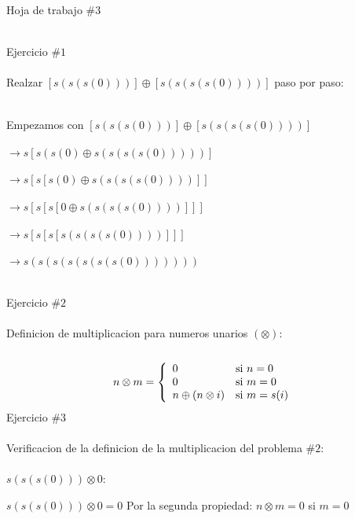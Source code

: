 \documentclass[]{article}
\begin{document}
\begin{center}
\Huge
Hoja de trabajo $\# 3$\\~\\
\end{center}
\Large
Ejercicio $\# 1$\\~\\
\normalsize
Realzar $[s(s(s(0)))] \oplus [s(s(s(s(0))))]$ paso por paso:\\~\\
\begin{center}
Empezamos con $[s(s(s(0)))] \oplus [s(s(s(s(0))))]$\\~\\
$\rightarrow s[s(s(0) \oplus s(s(s(s(0)))))]$\\~\\
$\rightarrow s[s[s(0) \oplus s(s(s(s(0))))]]$\\~\\
$\rightarrow s[s[s[0 \oplus s(s(s(s(0))))]]]$\\~\\
$\rightarrow s[s[s[s(s(s(s(0))))]]]$\\~\\
$\rightarrow s(s(s(s(s(s(s(0)))))))$\\~\\
\end{center}
\Large 
Ejercicio $\# 2$\\~\\
\normalsize
Definicion de multiplicacion para numeros unarios $(\otimes)$:\\~\\
\[
        n\otimes m = \left\{
        \begin{array}{l l}
            0 & \mbox{si } n=0 \\
            0 & \mbox{si } m=0 \\
            n \oplus (n \otimes i) & \mbox{si } m=s(i)\\
        \end{array}
        \right.
\]
\Large 
Ejercicio $\# 3$\\~\\
\normalsize
Verificacion de la definicion de la multiplicacion del problema $\# 2$:\\~\\
$s(s(s(0))) \otimes 0$:\\
\begin{center}
$s(s(s(0))) \otimes 0 = 0$ Por la segunda propiedad: $n \otimes m = 0 $ si $ m = 0$\\~\\
\end{center}
\end{document}
